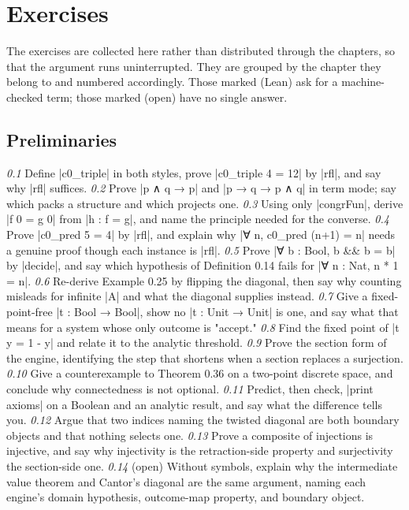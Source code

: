 \documentclass{memoir}
\begin{document}
\chapter{Exercises}\label{Two--Schemas--of--Impossibility-005F-005F-005F--Machine--Checked--Limits--of--Trustworthy--Machine--Learning-005F-005F-005F--and--Why--They--Tighten--with--Capability----Exercises}

The exercises are collected here rather than distributed through the chapters, so
that the argument runs uninterrupted. They are grouped by the chapter they belong
to and numbered accordingly. Those marked (Lean) ask for a machine-checked term;
those marked (open) have no single answer.



\section{Preliminaries}\label{Two--Schemas--of--Impossibility-005F-005F-005F--Machine--Checked--Limits--of--Trustworthy--Machine--Learning-005F-005F-005F--and--Why--They--Tighten--with--Capability----Exercises----Preliminaries}

\emph{0.1} Define \LeanVerb|c0_triple| in both styles, prove \LeanVerb|c0_triple 4 = 12| by \LeanVerb|rfl|, and say
why \LeanVerb|rfl| suffices.
\emph{0.2} Prove \LeanVerb|p ∧ q → p| and \LeanVerb|p → q → p ∧ q| in term mode; say which packs a
structure and which projects one.
\emph{0.3} Using only \LeanVerb|congrFun|, derive \LeanVerb|f 0 = g 0| from \LeanVerb|h : f = g|, and name the
principle needed for the converse.
\emph{0.4} Prove \LeanVerb|c0_pred 5 = 4| by \LeanVerb|rfl|, and explain why \LeanVerb|∀ n, c0_pred (n+1) = n| needs
a genuine proof though each instance is \LeanVerb|rfl|.
\emph{0.5} Prove \LeanVerb|∀ b : Bool, b && b = b| by \LeanVerb|decide|, and say which hypothesis of
Definition 0.14 fails for \LeanVerb|∀ n : Nat, n * 1 = n|.
\emph{0.6} Re-derive Example 0.25 by flipping the diagonal, then say why counting misleads
for infinite \LeanVerb|A| and what the diagonal supplies instead.
\emph{0.7} Give a fixed-point-free \LeanVerb|t : Bool → Bool|, show no \LeanVerb|t : Unit → Unit| is one,
and say what that means for a system whose only outcome is "accept."
\emph{0.8} Find the fixed point of \LeanVerb|t y = 1 - y| and relate it to the analytic threshold.
\emph{0.9} Prove the section form of the engine, identifying the step that shortens when a
section replaces a surjection.
\emph{0.10} Give a counterexample to Theorem 0.36 on a two-point discrete space, and
conclude why connectedness is not optional.
\emph{0.11} Predict, then check, \LeanVerb|print axioms| on a Boolean and an analytic result, and
say what the difference tells you.
\emph{0.12} Argue that two indices naming the twisted diagonal are both boundary objects
and that nothing selects one.
\emph{0.13} Prove a composite of injections is injective, and say why injectivity is the
retraction-side property and surjectivity the section-side one.
\emph{0.14} (open) Without symbols, explain why the intermediate value theorem and
Cantor's diagonal are the same argument, naming each engine's domain hypothesis,
outcome-map property, and boundary object.
\end{document}
